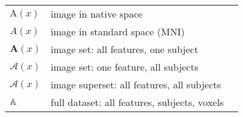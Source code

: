 \begin{singlespacing}
\begin{table}[H]
\begin{tabular}{lll}
  	$\mathrm{A}(x)$       & image in native space                        &                     \\
  	$A(x)$                & image in standard space (MNI)                &                     \\
  	$\bm{A}(x)$           & image set: all features, one subject         &                     \\
  	$\mathcal{A}(x)$      & image set: one feature, all subjects         &                     \\
  	$\bm{\mathcal{A}}(x)$ & image superset: all features, all subjects   &                     \\
  	$\mathbb{A}$             & full dataset: all features, subjects, voxels &                     \\ \hline
  \end{tabular}
\end{table}
\end{singlespacing}
\clearpage
{}
\setcounter{page}{1}
